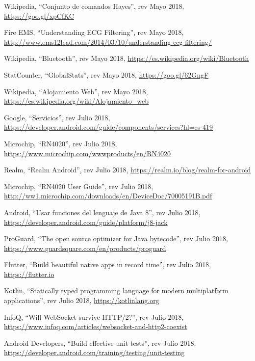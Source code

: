 \begin{thebibliography}{99}
 Wikipedia, ``Conjunto de comandos Hayes'', rev Mayo 2018, \hyperref[AT]{https://goo.gl/xpCfKC}

 Fire EMS, ``Understanding ECG Filtering'', rev Mayo 2018, \hyperref[ecg_rate]{http://www.ems12lead.com/2014/03/10/understanding-ecg-filtering/}

 Wikipedia, ``Bluetooth'', rev Mayo 2018, \hyperref[bluetooth]{https://es.wikipedia.org/wiki/Bluetooth}

 StatCounter, ``GlobalStats'', rev Mayo 2018, \hyperref[market_share_cita]{https://goo.gl/62GngF}

 Wikipedia, ``Alojamiento Web'', rev Mayo 2018, \hyperref[hosting_web]{https://es.wikipedia.org/wiki/Alojamiento\_web}

 Google, ``Servicios'', rev Julio 2018, \hyperref[services]{https://developer.android.com/guide/components/services?hl=es-419}

 Microchip, ``RN4020'', rev Julio 2018, \hyperref[RN4020_code]{https://www.microchip.com/wwwproducts/en/RN4020}

 Realm, ``Realm Android'', rev Julio 2018, \hyperref[realm_android]{https://realm.io/blog/realm-for-android}

 Microchip, ``RN4020 User Guide'', rev Julio 2018, \hyperref[user_guide_rn4020]{http://ww1.microchip.com/downloads/en/DeviceDoc/70005191B.pdf}

 Android, ``Usar funciones del lenguaje de Java 8'', rev Julio 2018, \hyperref[java8]{https://developer.android.com/guide/platform/j8-jack}

 ProGuard, ``The open source optimizer for Java bytecode'', rev Julio 2018, \hyperref[prroguard]{https://www.guardsquare.com/en/products/proguard}

 Flutter, ``Build beautiful native apps in record time'', rev Julio 2018, \hyperref[flutter]{https://flutter.io}

 Kotlin, ``Statically typed programming language for modern multiplatform applications'', rev Julio 2018, \hyperref[kotlin]{https://kotlinlang.org}


 InfoQ, ``Will WebSocket survive HTTP/2?'', rev Julio 2018, \hyperref[http2sse]{https://www.infoq.com/articles/websocket-and-http2-coexist}

 Android Developers, ``Build effective unit tests'', rev Julio 2018, \hyperref[unittest]{https://developer.android.com/training/testing/unit-testing}


\end{thebibliography}
